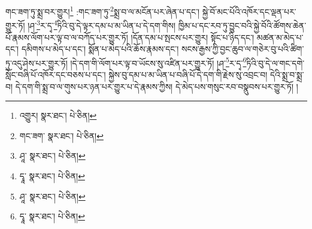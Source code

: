 གང་ཟག་ཏུ་སྨྲ་བར་གྱུར།\footnote{འགྱུར།  སྣར་ཐང་།  པེ་ཅིན། } :གང་ཟག་ཏུ་\footnote{གང་ཟག་  སྣར་ཐང་།  པེ་ཅིན། }སྨྲ་བ་ལ་མངོན་པར་ཞེན་པ་དང་། སྐྱེ་བོ་མང་པོའི་འཁོར་དང་ལྡན་པར་གྱུར་ཏོ། །ཤ་\footnote{ཤཱ་  སྣར་ཐང་།  པེ་ཅིན། }ར་དྭ་\footnote{དྭཱ་  སྣར་ཐང་།  པེ་ཅིན། }ཏིའི་བུ་དེ་ལྟར་དམ་པ་མ་ཡིན་པ་དེ་དག་གིས། ཁྱིམ་པ་དང་རབ་ཏུ་བྱུང་བའི་སྐྱེ་བོའི་ཚོགས་ཆེན་པོ་རྣམས་ལོག་པར་ལྟ་བ་ལ་བཀོད་པར་གྱུར་ཏོ། །དོན་དམ་པ་སྤངས་པར་གྱུར། སྟོང་པ་ཉིད་དང་། མཚན་མ་མེད་པ་དང་། དམིགས་པ་མེད་པ་དང་། སྨོན་པ་མེད་པའི་ཆོས་རྣམས་དང་། སངས་རྒྱས་ཀྱི་བྱང་ཆུབ་ལ་གཅེར་བུ་པའི་ཚིག་ཏུ་འདུ་ཤེས་པར་གྱུར་ཏོ། །དེ་དག་གི་ལོག་པར་ལྟ་བ་ཡོངས་སུ་འཛིན་པར་གྱུར་ཏོ། །ཤ་\footnote{ཤཱ་  སྣར་ཐང་།  པེ་ཅིན། }ར་དྭ་\footnote{དྭཱ་  སྣར་ཐང་།  པེ་ཅིན། }ཏིའི་བུ་དེ་ལ་གང་དགེ་སློང་བཞི་པོ་འཁོར་དང་བཅས་པ་དང་། སྐྱེས་བུ་དམ་པ་མ་ཡིན་པ་བཞི་པོ་དེ་དག་གི་རྗེས་སུ་འབྲང་བ། དེའི་སྨྲ་བ་སྨྲ་བ། དེ་དག་གི་སྨྲ་བ་ལ་གུས་པར་ཉན་པར་གྱུར་པ་དེ་རྣམས་ཀྱིས། དེ་མེད་པས་གསུང་རབ་བསྣུབས་པར་གྱུར་ཏོ། །
